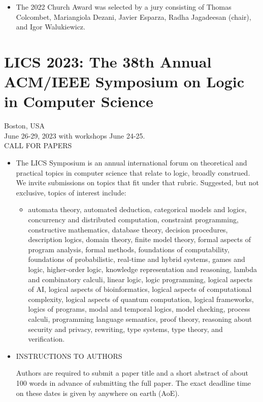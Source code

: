 \documentclass[prodmode,acmtecs]{acmsmall} %
\begin{document}
\begin{itemize}
\item  The 2022 Church Award was selected by a jury consisting of Thomas Colcombet, Mariangiola Dezani, Javier Esparza, Radha Jagadeesan (chair), and Igor Walukiewicz. 
 
\end{itemize}\section{LICS 2023: The 38th Annual ACM/IEEE Symposium on Logic in Computer Science}\label{LICS2023} Boston, USA \\ 
 June 26-29, 2023 with workshops June 24-25.\\ 
CALL FOR PAPERS 

\begin{itemize}\item  The LICS Symposium is an annual international forum on theoretical and practical topics in computer science that relate to logic, broadly construed. We invite submissions on topics that fit under that rubric. Suggested, but not exclusive, topics of interest include: 
 
\begin{itemize}\item  automata theory, automated deduction, categorical models and logics, concurrency and distributed computation, constraint programming, constructive mathematics, database theory, decision procedures, description logics, domain theory, finite model theory, formal aspects of program analysis, formal methods, foundations of computability, foundations of probabilistic, real-time and hybrid systems, games and logic, higher-order logic, knowledge representation and reasoning, lambda and combinatory calculi, linear logic, logic programming, logical aspects of AI, logical aspects of bioinformatics, logical aspects of computational complexity, logical aspects of quantum computation, logical frameworks, logics of programs, modal and temporal logics, model checking, process calculi, programming language semantics, proof theory, reasoning about security and privacy, rewriting, type systems, type theory, and verification.
\end{itemize} 
\item  INSTRUCTIONS TO AUTHORS 
 
  Authors are required to submit a paper title and a short abstract of about 100 words in advance of submitting the full paper. The exact deadline time on these dates is given by anywhere on earth (AoE). 
 

\end{itemize}
\end{document}
